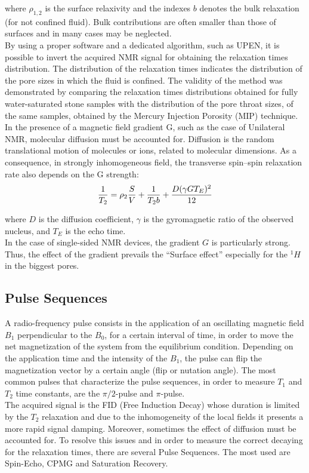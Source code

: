 \documentclass[a4paper,11pt]{report}
\begin{document}
where $\rho_{1,2}$ is the surface relaxivity and the indexes $b$ denotes the bulk relaxation (for not confined fluid). Bulk contributions are often smaller than those of surfaces and in many cases may be neglected\cite{uno}.\\
By using a proper software and a dedicated algorithm, such as UPEN, it is possible to invert the acquired NMR signal for obtaining the relaxation times distribution\cite{undici}. The distribution of the relaxation times indicates the distribution of the pore sizes in which the fluid is confined. The validity of the method was demonstrated by comparing the relaxation times distributions obtained for fully water-saturated stone samples with the distribution of the pore throat sizes, of the same samples, obtained by the Mercury Injection Porosity (MIP) technique\cite{due}.
In the presence of a magnetic field gradient G, such as the case of Unilateral NMR, molecular diffusion must be accounted for.  Diffusion is the random translational motion of molecules or ions, related to molecular dimensions. As a consequence, in strongly inhomogeneous field, the transverse spin–spin relaxation rate also depends on the G strength:
\begin{equation} \label{surface effect 2}
	\large{\frac{1}{T_{2}}=\rho_{2}\frac{S}{V}+\frac{1}{T_{2}b}+\frac{D(\gamma G T_E)^2}{12}}
\end{equation}

where $D$ is the diffusion coefficient, $\gamma$ is the gyromagnetic ratio of the observed nucleus, and $T_E$ is the echo time.\\ 
In the case of single-sided NMR devices, the gradient $G$ is particularly strong. Thus, the effect of the gradient prevails the “Surface effect” especially for the $^1H$ in the biggest pores.
\subsection{Pulse Sequences}
A radio-frequency pulse consists in the application of an oscillating magnetic field $B_1$ perpendicular to the $B_0$, for a certain interval of time, in order to move the net magnetization of the system from the equilibrium condition. Depending on the application time and the intensity of the $B_1$, the pulse can flip the magnetization vector by a certain angle (flip or nutation angle). The most common pulses that characterize the pulse sequences, in order to measure $T_1$ and $T_2$ time constants, are the $\pi/2$-pulse and $\pi$-pulse.\\ The acquired signal is the FID (Free Induction Decay) whose duration is limited by the $T_2$ relaxation and due to the inhomogeneity of the local fields it presents a more rapid signal damping. Moreover, sometimes the effect of diffusion must be accounted for. To resolve this issues and in order to measure the correct decaying for the relaxation times, there are several Pulse Sequences. The most used are Spin-Echo, CPMG and Saturation Recovery. 
\end{document}
